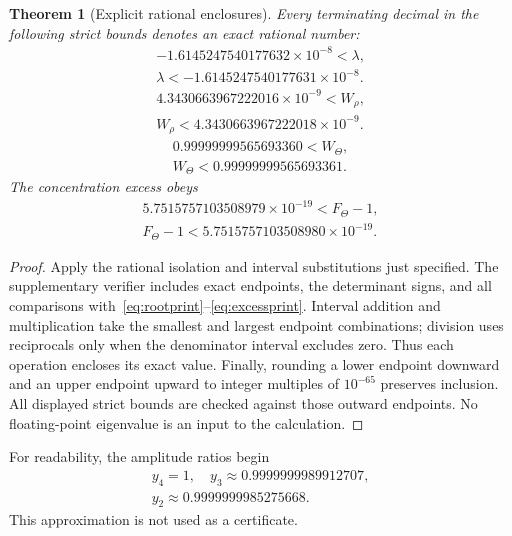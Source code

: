 \documentclass[journal,a4paper,10pt]{IEEEtran}
\newtheorem{theorem}{Theorem}
\theoremstyle{definition}\newtheorem{definition}[theorem]{Definition}
\theoremstyle{remark}\newtheorem{remark}[theorem]{Remark}
\begin{document}
\begin{theorem}[Explicit rational enclosures]\label{thm:enclosures}
Every terminating decimal in the following strict bounds denotes an exact rational number:
\begin{equation}\label{eq:rootprint}
\begin{gathered}
-1.6145247540177632\times10^{-8}<\lambda,\\
\lambda<-1.6145247540177631\times10^{-8}.
\end{gathered}
\end{equation}
\begin{equation}\label{eq:wrprint}
\begin{gathered}
4.3430663967222016\times10^{-9}<W_\rho,\\
W_\rho<4.3430663967222018\times10^{-9}.
\end{gathered}
\end{equation}
\begin{equation}\label{eq:wtprint}
\begin{gathered}
0.99999999565693360<W_\Theta,\\
W_\Theta<0.99999999565693361.
\end{gathered}
\end{equation}
The concentration excess obeys
\begin{equation}\label{eq:excessprint}
\begin{gathered}
5.7515757103508979\times10^{-19}<F_\Theta-1,\\
F_\Theta-1<5.7515757103508980\times10^{-19}.
\end{gathered}
\end{equation}
\end{theorem}
\begin{proof}
Apply the rational isolation and interval substitutions just specified. The supplementary verifier includes exact endpoints, the determinant signs, and all comparisons with~\eqref{eq:rootprint}--\eqref{eq:excessprint}. Interval addition and multiplication take the smallest and largest endpoint combinations; division uses reciprocals only when the denominator interval excludes zero. Thus each operation encloses its exact value. Finally, rounding a lower endpoint downward and an upper endpoint upward to integer multiples of $10^{-65}$ preserves inclusion. All displayed strict bounds are checked against those outward endpoints. No floating-point eigenvalue is an input to the calculation.
\end{proof}
For readability, the amplitude ratios begin
\begin{equation}
\begin{gathered}
y_4=1,\quad y_3\approx0.9999999989912707,\\
y_2\approx0.9999999985275668.
\end{gathered}
\end{equation}
This approximation is not used as a certificate.
\end{document}
